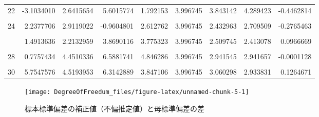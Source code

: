 \documentclass[]{tufte-handout}
\begin{document}
\begin{table}
{\begin{tabular}[t]{rrrrrrrrr}
22 & -3.1034010 & 2.6415654 & 5.6015774 & 1.792153 & 3.996745 & 3.843142 & 4.289423 & -0.4462814\\
\cellcolor{gray!6}{23} & \cellcolor{gray!6}{1.9884340} & \cellcolor{gray!6}{1.4358724} & \cellcolor{gray!6}{4.4602812} & \cellcolor{gray!6}{3.354269} & \cellcolor{gray!6}{3.996745} & \cellcolor{gray!6}{1.940232} & \cellcolor{gray!6}{1.965596} & \cellcolor{gray!6}{-0.0253637}\\
24 & 2.2377706 & 2.9119022 & -0.9604801 & 2.612762 & 3.996745 & 2.432963 & 2.709509 & -0.2765463\\
\cellcolor{gray!6}{25} & \cellcolor{gray!6}{10.1334809} & \cellcolor{gray!6}{9.3962861} & \cellcolor{gray!6}{0.9661430} & \cellcolor{gray!6}{4.402635} & \cellcolor{gray!6}{3.996745} & \cellcolor{gray!6}{3.630622} & \cellcolor{gray!6}{3.499673} & \cellcolor{gray!6}{0.1309489}\\
\addlinespace
26 & 1.4913636 & 2.2132959 & 3.8690116 & 3.775323 & 3.996745 & 2.509745 & 2.413078 & 0.0966669\\
\cellcolor{gray!6}{27} & \cellcolor{gray!6}{0.6061874} & \cellcolor{gray!6}{5.7470604} & \cellcolor{gray!6}{6.8969015} & \cellcolor{gray!6}{3.734887} & \cellcolor{gray!6}{3.996745} & \cellcolor{gray!6}{2.320765} & \cellcolor{gray!6}{2.237340} & \cellcolor{gray!6}{0.0834250}\\
28 & 0.7757434 & 4.4510336 & 6.5881741 & 4.846286 & 3.996745 & 2.941545 & 2.941657 & -0.0001128\\
\cellcolor{gray!6}{29} & \cellcolor{gray!6}{4.1562629} & \cellcolor{gray!6}{-0.1827302} & \cellcolor{gray!6}{4.1072400} & \cellcolor{gray!6}{3.105353} & \cellcolor{gray!6}{3.996745} & \cellcolor{gray!6}{2.683109} & \cellcolor{gray!6}{2.719142} & \cellcolor{gray!6}{-0.0360325}\\
30 & 5.7547576 & 4.5193953 & 6.3142889 & 3.847106 & 3.996745 & 3.060298 & 2.933831 & 0.1264671\\
\bottomrule
\end{tabular}}
\end{table}

\begin{figure}

{\centering \texttt{[image: DegreeOfFreedum\_files/figure-latex/unnamed-chunk-5-1]} 

}

\caption[標本標準偏差の補正値（不偏推定値）と母標準偏差の差]{標本標準偏差の補正値（不偏推定値）と母標準偏差の差}\label{fig:unnamed-chunk-5}
\end{figure}
\end{document}
